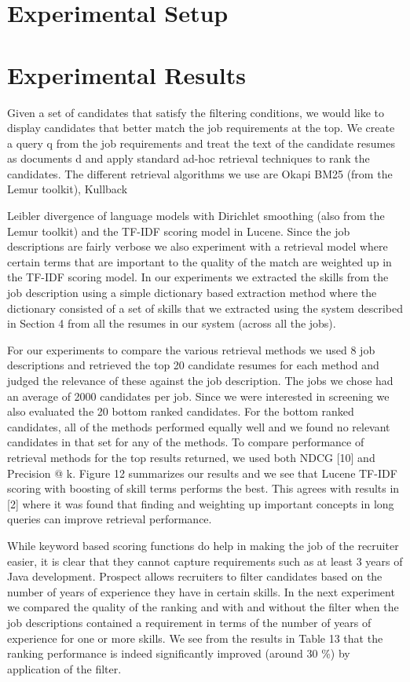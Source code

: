 \section{Experimental Setup}



\section{Experimental Results}

Given a set of candidates that satisfy the filtering conditions, we would like to display candidates that better match
the job requirements at the top. We create a query q from the job requirements and treat the text of the candidate resumes as documents d and apply standard ad-hoc retrieval techniques to rank the candidates. The different retrieval algorithms we use are Okapi BM25 (from the Lemur toolkit), Kullback{Leibler divergence of language models with Dirichlet smoothing (also from the Lemur toolkit) and the TF-IDF scoring model in Lucene. Since the job descriptions are fairly verbose we also experiment with a retrieval model where certain terms that are important to the quality of the match are weighted up in the TF-IDF scoring model. In our experiments we extracted the skills from the job description using a simple dictionary based extraction method where the dictionary consisted of a set of skills that we extracted using the system described in Section 4 from all the resumes in our system (across all the jobs).

For our experiments to compare the various retrieval methods we used 8 job descriptions and retrieved the top 20 candidate resumes for each method and judged the relevance of these against the job description. The jobs we chose had an
average of 2000 candidates per job. Since we were interested in screening we also evaluated the 20 bottom ranked candidates. For the bottom ranked candidates, all of the methods performed equally well and we found no relevant candidates 
in that set for any of the methods. To compare performance of retrieval methods for the top results returned, we used
both NDCG [10] and Precision @ k. Figure 12 summarizes our results and we see that Lucene TF-IDF scoring with
boosting of skill terms performs the best. This agrees with results in [2] where it was found that finding and weighting
up important concepts in long queries can improve retrieval performance.

While keyword based scoring functions do help in making the job of the recruiter easier, it is clear that they cannot
capture requirements such as at least 3 years of Java development. Prospect allows recruiters to filter candidates
based on the number of years of experience they have in certain skills. In the next experiment we compared the quality
of the ranking and with and without the filter when the job descriptions contained a requirement in terms of the number
of years of experience for one or more skills. We see from the results in Table 13 that the ranking performance is indeed
significantly improved (around 30 \%) by application of the filter.

}
